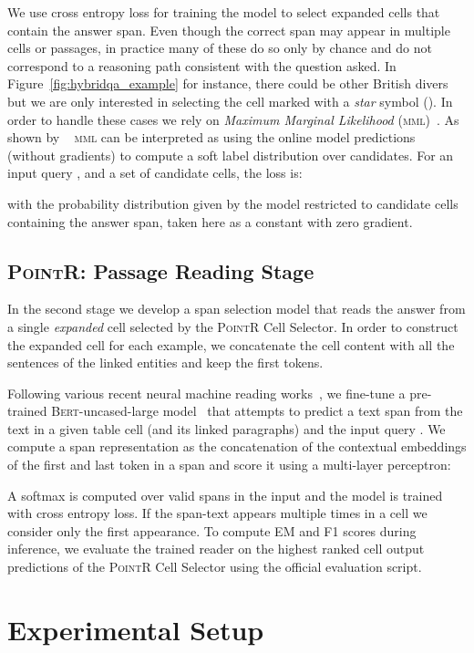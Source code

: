 \documentclass[11pt]{article}
\newcommand{\abr}[1]{\textsc{#1}}
\newcommand{\pointr}{\textsc{PointR}\xspace}
\newcommand{\bert}{\textsc{Bert}\xspace}
\begin{document}
We use cross entropy loss for training the model to select expanded cells that contain the answer span.
Even though the correct span may appear in multiple cells or passages, in practice many of these do so only by chance and do not correspond to a reasoning path consistent with the question asked. 
In Figure~\ref{fig:hybridqa_example} for instance, there could be other British divers but we are only interested in selecting the cell marked with a \emph{star} symbol ().
In order to handle these cases we rely on \emph{Maximum Marginal Likelihood} (\abr{mml})~\cite{liang-etal-2013-learning, berant-etal-2013-semantic}. As shown by ~\citet{guu-etal-2017-language} \abr{mml} can be interpreted as using the online model predictions (without gradients) to compute a soft label distribution over candidates. 
For an input query , and a set  of candidate cells, the loss is:

with  the probability distribution given by the model restricted to candidate cells containing the answer span, taken here as a constant with zero gradient. \subsection{\pointr: Passage Reading Stage}
In the second stage we develop a span selection model that reads the answer from a single \emph{expanded} cell selected by the \pointr Cell Selector.
In order to construct the expanded cell for each example, we concatenate the cell content with all the sentences of the linked entities
and keep the first  tokens.


Following various recent neural machine reading works~\cite{chen-etal-2017-reading, lee-19, herzig-etal-2021-open}, we fine-tune a pre-trained \bert-uncased-large model~\cite{devlin-19} that attempts to predict a text span from the text in a given table cell  (and its linked paragraphs) and the input query . 
We compute a span representation as the concatenation of the contextual embeddings of the first and
last token in a span  and score it using a multi-layer perceptron:


A softmax is computed over valid spans in the input and the model is trained with cross entropy loss. If the span-text appears multiple times in a cell we consider only the first appearance. 
To compute EM and F1 scores during inference, we evaluate the trained reader on the highest ranked cell output predictions of the \pointr Cell Selector
using the official evaluation script.

  \section{Experimental Setup}
\label{sec:experiments}
\end{document}
